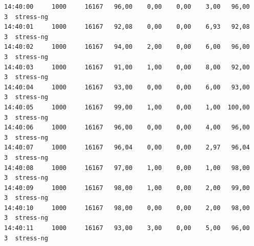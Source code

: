 \documentclass[12pt,onecolumn]{article}
\begin{document}
\begin{verbatim}
14:40:00     1000     16167   96,00    0,00    0,00    3,00   96,00     3  stress-ng
14:40:01     1000     16167   92,08    0,00    0,00    6,93   92,08     3  stress-ng
14:40:02     1000     16167   94,00    2,00    0,00    6,00   96,00     3  stress-ng
14:40:03     1000     16167   91,00    1,00    0,00    8,00   92,00     3  stress-ng
14:40:04     1000     16167   93,00    0,00    0,00    6,00   93,00     3  stress-ng
14:40:05     1000     16167   99,00    1,00    0,00    1,00  100,00     3  stress-ng
14:40:06     1000     16167   96,00    0,00    0,00    4,00   96,00     3  stress-ng
14:40:07     1000     16167   96,04    0,00    0,00    2,97   96,04     3  stress-ng
14:40:08     1000     16167   97,00    1,00    0,00    1,00   98,00     3  stress-ng
14:40:09     1000     16167   98,00    1,00    0,00    2,00   99,00     3  stress-ng
14:40:10     1000     16167   98,00    0,00    0,00    2,00   98,00     3  stress-ng
14:40:11     1000     16167   93,00    3,00    0,00    5,00   96,00     3  stress-ng


\end{verbatim}
\end{document}
